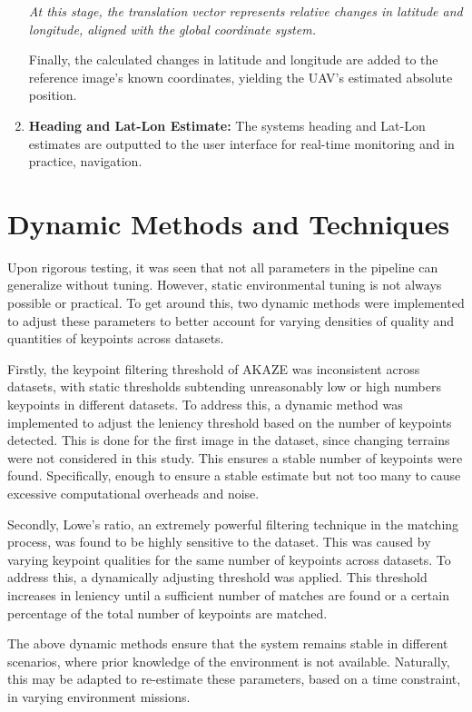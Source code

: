 \begin{enumerate}
    \emph{At this stage, the translation vector represents relative changes in latitude and longitude, aligned with the global coordinate system.}

    Finally, the calculated changes in latitude and longitude are added to the reference image’s known coordinates, yielding the UAV’s estimated absolute position.  

    \item \textbf{Heading and Lat-Lon Estimate:}
    The systems heading and Lat-Lon estimates are outputted to the user interface for real-time monitoring and in practice, navigation.


\end{enumerate}


\section{Dynamic Methods and Techniques}
Upon rigorous testing, it was seen that not all parameters in the pipeline can generalize without tuning. However, static environmental tuning is not always possible or practical. To get around this, two dynamic methods were implemented to adjust these parameters to better account for varying densities of quality and quantities of keypoints across datasets. 

Firstly, the keypoint filtering threshold of AKAZE was inconsistent across datasets, with static thresholds subtending unreasonably low or high numbers keypoints in different datasets. To address this, a dynamic method was implemented to adjust the leniency threshold based on the number of keypoints detected. This is done for the first image in the dataset, since changing terrains were not considered in this study. This ensures a stable number of keypoints were found. Specifically, enough to ensure a stable estimate but not too many to cause excessive computational overheads and noise.

Secondly, Lowe's ratio, an extremely powerful filtering technique in the matching process, was found to be highly sensitive to the dataset. This was caused by varying keypoint qualities for the same number of keypoints across datasets. To address this, a dynamically adjusting threshold was applied. This threshold increases in leniency until a sufficient number of matches are found or a certain percentage of the total number of keypoints are matched. 

The above dynamic methods ensure that the system remains stable in different scenarios, where prior knowledge of the environment is not available. Naturally, this may be adapted to re-estimate these parameters, based on a time constraint, in varying environment missions. 


